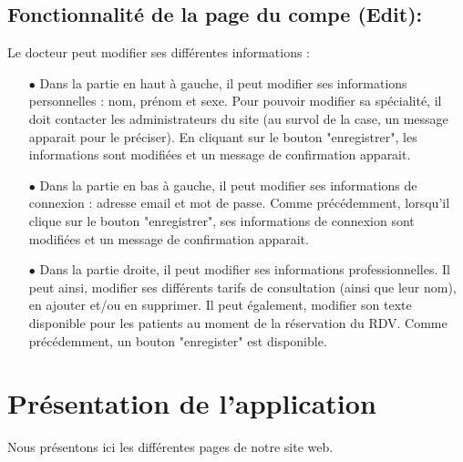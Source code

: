 \documentclass[a4paper]{report}
\begin{document}
\subsection{{Fonctionnalité de la page du compe (Edit)}:}\label{edit2}
Le docteur peut modifier ses différentes informations :
\begin{itemize}
    \item[$\bullet$] Dans la partie en haut à gauche, il peut modifier ses informations personnelles : nom, prénom et sexe. Pour pouvoir modifier sa spécialité,
    il doit contacter les administrateurs du site (au survol de la case, un message apparait pour le préciser). En cliquant sur le bouton "enregistrer", les informations sont 
    modifiées et un message de confirmation apparait.
    \item[$\bullet$] Dans la partie en bas à gauche, il peut modifier ses informations de connexion : adresse email et mot de passe. Comme précédemment, lorsqu'il clique sur le bouton "enregistrer", ses
    informations de connexion sont modifiées et un message de confirmation apparait.
    \item[$\bullet$] Dans la partie droite, il peut modifier ses informations professionnelles. Il peut ainsi, modifier ses différents tarifs de consultation (ainsi que leur nom), en ajouter et/ou 
    en supprimer. Il peut également, modifier son texte disponible pour les patients au moment de la réservation du RDV. Comme précédemment, un bouton "enregister" est disponible.
\end{itemize}
\vspace{1cm}

\section{{\noindent Présentation de l'application }}

\vspace{0.6cm}
Nous présentons ici les différentes pages de notre site web.
\end{document}
